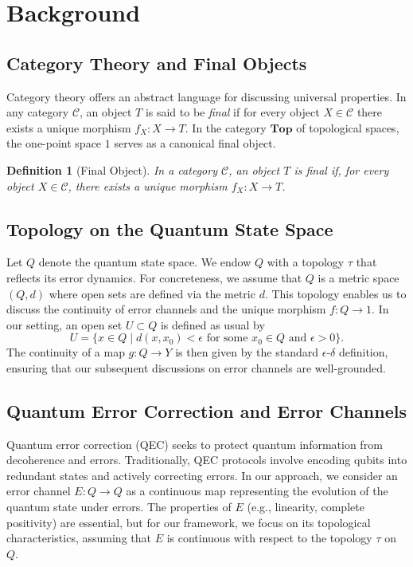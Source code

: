 \documentclass[11pt]{article}
\newtheorem{definition}[theorem]{Definition}
\begin{document}
\section{Background}
\label{sec:background}

\subsection{Category Theory and Final Objects}
Category theory offers an abstract language for discussing universal properties. In any category \(\mathcal{C}\), an object \(T\) is said to be \emph{final} if for every object \(X\in\mathcal{C}\) there exists a unique morphism \(f_X: X\to T\). In the category \(\mathbf{Top}\) of topological spaces, the one-point space \(1\) serves as a canonical final object.

\begin{definition}[Final Object]
In a category \(\mathcal{C}\), an object \(T\) is \emph{final} if, for every object \(X\in\mathcal{C}\), there exists a unique morphism \(f_X: X\to T\).
\end{definition}

\subsection{Topology on the Quantum State Space}
Let \(Q\) denote the quantum state space. We endow \(Q\) with a topology \(\tau\) that reflects its error dynamics. For concreteness, we assume that \(Q\) is a metric space \((Q, d)\) where open sets are defined via the metric \(d\). This topology enables us to discuss the continuity of error channels and the unique morphism \(f: Q\to 1\). In our setting, an open set \(U \subset Q\) is defined as usual by
\[
U = \{ x \in Q \mid d(x, x_0) < \epsilon \text{ for some } x_0\in Q \text{ and } \epsilon > 0\}.
\]
The continuity of a map \(g: Q\to Y\) is then given by the standard \(\epsilon\)-\(\delta\) definition, ensuring that our subsequent discussions on error channels are well-grounded.

\subsection{Quantum Error Correction and Error Channels}
Quantum error correction (QEC) seeks to protect quantum information from decoherence and errors. Traditionally, QEC protocols involve encoding qubits into redundant states and actively correcting errors. In our approach, we consider an error channel \(E: Q\to Q\) as a continuous map representing the evolution of the quantum state under errors. The properties of \(E\) (e.g., linearity, complete positivity) are essential, but for our framework, we focus on its topological characteristics, assuming that \(E\) is continuous with respect to the topology \(\tau\) on \(Q\).
\end{document}
